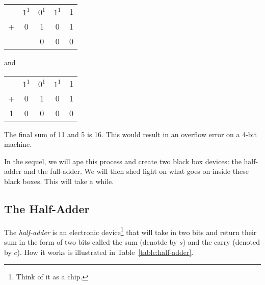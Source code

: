 \begin{center}
	\begin{tabular}{ccccc} 
		& $1^1$ & $0^1$ & $1^1$ & 1 \\
		+ & 0 & 1 & 0 & 1 \\ \hline
		&   & 0  &     0  & 0
	\end{tabular}
\end{center}
and
\begin{center}
	\begin{tabular}{ccccc} 
		& $1^1$ & $0^1$ & $1^1$ & 1 \\
		+ & 0 & 1 & 0 & 1 \\ \hline
	1	&  0 & 0  &     0  & 0
	\end{tabular}
\end{center}

The final sum of 11 and 5 is 16.  This would result in an overflow error on a 4-bit machine.

In the sequel, we will ape this process and create two black box devices: the half-adder and the full-adder.  We will then shed light on what goes on inside these black boxes.  This will take a while.

\subsection{The Half-Adder}
The \emph{half-adder} is an electronic device\footnote{Think of it as a chip.} that will take in two bits and return their sum in the form of two bits called the sum (denotde by $s$) and the carry (denoted by $c$).  How it works is illustrated in Table~\ref{table:half-adder}. 

